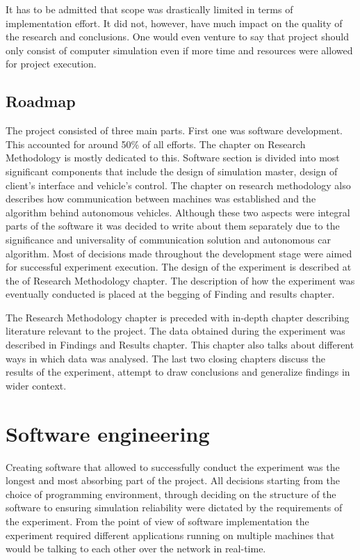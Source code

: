 \documentclass[11pt,english]{article}
\begin{document}
It has to be admitted that scope was drastically limited in terms of implementation effort. It did not, however, have much impact on the quality of the research and conclusions. One would even venture to say that project should only consist of computer simulation even if more time and resources were allowed for project execution. 



\subsection{Roadmap}

The project consisted of three main parts. First one was software development. This accounted for around 50\% of all efforts. The chapter on Research Methodology is mostly dedicated to this. Software section is divided into most significant components that include the design of simulation master, design of client's interface and vehicle's control. The chapter on research methodology also describes how communication between machines was established and the algorithm behind autonomous vehicles. Although these two aspects were integral parts of the software it was decided to write about them separately due to the significance and universality of communication solution and autonomous car algorithm. 
Most of decisions made throughout the development stage were aimed for successful experiment execution. The design of the experiment is described at the of Research Methodology chapter. The description of how the experiment was eventually conducted is placed at the begging of Finding and results chapter.


The Research Methodology chapter is preceded with in-depth chapter describing literature relevant to the project. The data obtained during the experiment was described in Findings and Results chapter. This chapter also talks about different ways in which data was analysed. The last two closing chapters discuss the results of the experiment, attempt to draw conclusions and generalize findings in wider context. 





\section{Software engineering}

Creating software that allowed to successfully conduct the experiment was the longest and most absorbing part of the project. All decisions starting from the choice of programming environment, through deciding on the structure of the software to ensuring simulation reliability were dictated by the requirements of the experiment. From the point of view of software implementation the experiment required different applications running on multiple machines that would be talking to each other over the network in real-time.
\end{document}
